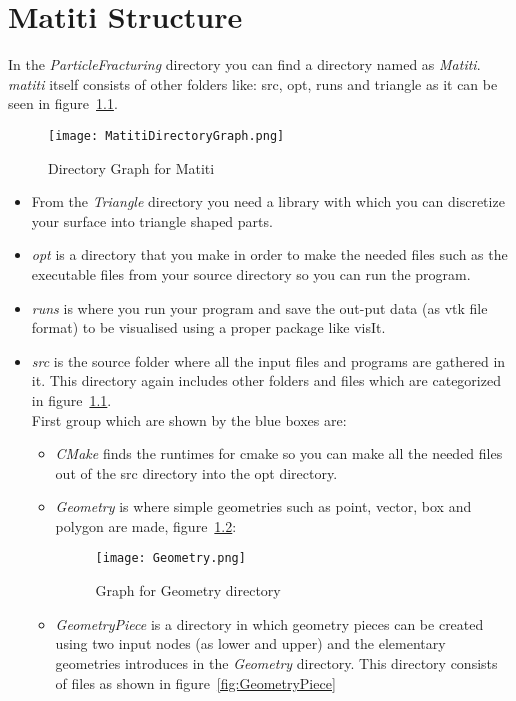 \documentclass[11pt,fleqn]{book} %
\begin{document}
\chapter{Matiti Structure} 
\label{sec:MatitiStructure} 
In the \emph{ParticleFracturing} directory you can find a directory named as \emph{Matiti}. \emph{matiti} itself consists of other folders like: src, opt, runs and triangle as it can be seen in figure~\ref{fig:MatitiDirectoryGraph}.
\begin{figure}
  \texttt{[image: MatitiDirectoryGraph.png]}
  \caption{Directory Graph for Matiti}
  \label{fig:MatitiDirectoryGraph}
\end{figure}
\begin{itemize}
\item From the \emph{Triangle} directory you need a library with which you can discretize your surface into triangle shaped parts.    
\item \emph{opt} is a directory that you make in order to make the needed files such as the executable files from your source directory so you can run the program. 
\item \emph{runs} is where you run your program and save the out-put data (as vtk file format) to be visualised using a proper package like visIt. 
\item \emph{src} is the source folder where all the input files and programs are gathered in it. This directory again includes other folders and files which are categorized in figure~\ref{fig:MatitiDirectoryGraph}. \\
First group which are shown by the blue boxes are:
 \begin{itemize}
 \item \emph{CMake} finds the runtimes for cmake so you can make all the needed files out of the src directory into the opt directory.
 \item \emph{Geometry} is where simple geometries such as point, vector, box and polygon are made, figure~\ref{fig:Geometry}:
\begin{figure}
  \texttt{[image: Geometry.png]}
  \caption{Graph for Geometry directory}
  \label{fig:Geometry}
\end{figure}
 \item \emph{GeometryPiece} is a directory in which geometry pieces can be created using two input nodes (as lower and upper) and the elementary geometries introduces in the \emph{Geometry} directory. This directory consists of files as shown in figure~\ref{fig:GeometryPiece}
\begin{figure}

\end{figure}
\end{itemize}
\end{itemize}
\end{document}

